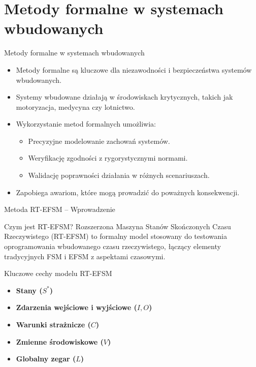 \documentclass{beamer}
\begin{document}
\section{Metody formalne w systemach wbudowanych}
\begin{frame}{Metody formalne w systemach wbudowanych}
  \begin{itemize}
    \item Metody formalne są kluczowe dla niezawodności i bezpieczeństwa systemów wbudowanych.
    \item Systemy wbudowane działają w środowiskach krytycznych, takich jak motoryzacja, medycyna czy lotnictwo.
    \item Wykorzystanie metod formalnych umożliwia:
      \begin{itemize}
        \item Precyzyjne modelowanie zachowań systemów.
        \item Weryfikację zgodności z rygorystycznymi normami.
        \item Walidację poprawności działania w różnych scenariuszach.
      \end{itemize}
    \item Zapobiega awariom, które mogą prowadzić do poważnych konsekwencji.
  \end{itemize}
\end{frame}

\begin{frame}{Metoda RT-EFSM – Wprowadzenie}
  \begin{block}{Czym jest RT-EFSM?}
    Rozszerzona Maszyna Stanów Skończonych Czasu Rzeczywistego (RT-EFSM) to formalny model stosowany do testowania oprogramowania wbudowanego czasu rzeczywistego,
    łączący elementy tradycyjnych FSM i EFSM z aspektami czasowymi.
  \end{block}
  \begin{block}{Kluczowe cechy modelu RT-EFSM}
    \begin{itemize}
      \item \textbf{Stany (\(S^*\))}
      \item \textbf{Zdarzenia wejściowe i wyjściowe (\(I, O\))}
      \item \textbf{Warunki strażnicze (\(C\))}
      \item \textbf{Zmienne środowiskowe (\(V\))}
      \item \textbf{Globalny zegar (\(L\))}
    \end{itemize}
  \end{block}
\end{frame}
\end{document}
